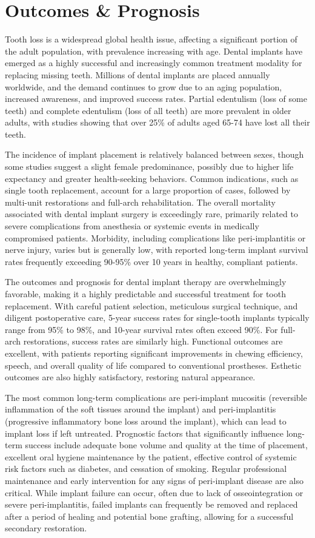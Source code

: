 \section*{Outcomes \& Prognosis}
Tooth loss is a widespread global health issue, affecting a significant portion of the adult population, with prevalence increasing with age. Dental implants have emerged as a highly successful and increasingly common treatment modality for replacing missing teeth. Millions of dental implants are placed annually worldwide, and the demand continues to grow due to an aging population, increased awareness, and improved success rates. Partial edentulism (loss of some teeth) and complete edentulism (loss of all teeth) are more prevalent in older adults, with studies showing that over 25\% of adults aged 65-74 have lost all their teeth.

The incidence of implant placement is relatively balanced between sexes, though some studies suggest a slight female predominance, possibly due to higher life expectancy and greater health-seeking behaviors. Common indications, such as single tooth replacement, account for a large proportion of cases, followed by multi-unit restorations and full-arch rehabilitation. The overall mortality associated with dental implant surgery is exceedingly rare, primarily related to severe complications from anesthesia or systemic events in medically compromised patients. Morbidity, including complications like peri-implantitis or nerve injury, varies but is generally low, with reported long-term implant survival rates frequently exceeding 90-95\% over 10 years in healthy, compliant patients.

The outcomes and prognosis for dental implant therapy are overwhelmingly favorable, making it a highly predictable and successful treatment for tooth replacement. With careful patient selection, meticulous surgical technique, and diligent postoperative care, 5-year success rates for single-tooth implants typically range from 95\% to 98\%, and 10-year survival rates often exceed 90\%. For full-arch restorations, success rates are similarly high. Functional outcomes are excellent, with patients reporting significant improvements in chewing efficiency, speech, and overall quality of life compared to conventional prostheses. Esthetic outcomes are also highly satisfactory, restoring natural appearance.

The most common long-term complications are peri-implant mucositis (reversible inflammation of the soft tissues around the implant) and peri-implantitis (progressive inflammatory bone loss around the implant), which can lead to implant loss if left untreated. Prognostic factors that significantly influence long-term success include adequate bone volume and quality at the time of placement, excellent oral hygiene maintenance by the patient, effective control of systemic risk factors such as diabetes, and cessation of smoking. Regular professional maintenance and early intervention for any signs of peri-implant disease are also critical. While implant failure can occur, often due to lack of osseointegration or severe peri-implantitis, failed implants can frequently be removed and replaced after a period of healing and potential bone grafting, allowing for a successful secondary restoration.

